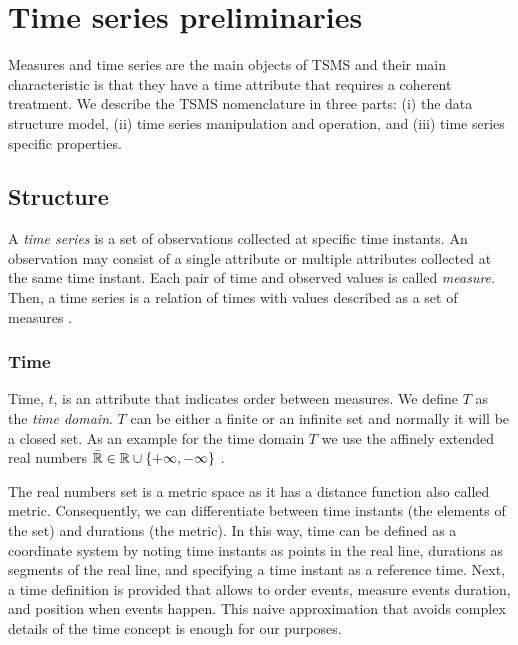 

\section{Time series preliminaries}
\label{sec:model:preliminaries}



Measures and time series are the main objects of TSMS and their main
characteristic is that they have a time attribute that requires a
coherent treatment. We describe the TSMS nomenclature in three parts:
(i) the data structure model, (ii) time series manipulation and
operation, and (iii) time series specific properties.



\subsection{Structure}


A \emph{time series} is a set of observations collected at specific
time instants. An observation may consist of a single attribute or
multiple attributes collected at the same time instant.  Each pair of
time and observed values is called \emph{measure}. Then, a time series
is a relation of times with values described as a set of measures .





\subsubsection{Time}

Time, $t$, is an attribute that indicates order between measures. We define
$T$ as the \emph{time domain}. $T$ can be either a finite or an infinite set
and normally it will be a closed set. As an example for the time
domain $T$ we use the affinely extended real numbers $\bar{\mathbb{R}} \in \mathbb{R} \cup
\{+\infty,-\infty\}$ \cite{cantrell:extendedreal}.

The real numbers set is a metric space as it has a distance function
also called metric. Consequently, we can differentiate between time
instants (the elements of the set) and durations (the metric). In this
way, time can be defined as a coordinate system
\cite{iep:time-supplement,kopetz11:realtime} by noting time instants
as points in the real line, durations as segments of the real line,
and specifying a time instant as a reference time. Next, a time
definition is provided that allows to order events, measure events
duration, and position when events happen. This naive approximation
that avoids complex details of the time concept is enough for our
purposes.

